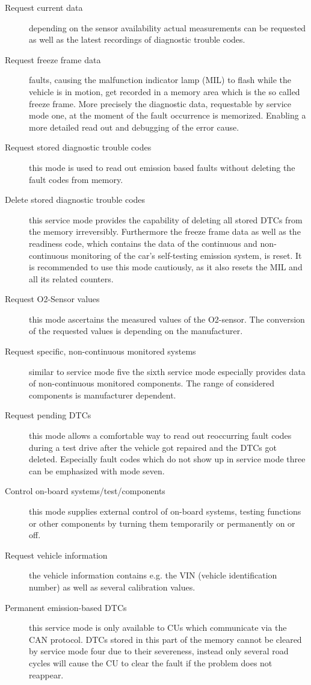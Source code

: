 \begin{description}
 \item[Request current data] depending on the sensor availability actual measurements can be requested as well as the latest recordings of diagnostic trouble codes.
 \item[Request freeze frame data] faults, causing the malfunction indicator lamp (MIL) to flash while the vehicle is in motion, get recorded in a memory area which is the so called freeze frame. More precisely the diagnostic data, requestable by service mode one, at the moment of the fault occurrence is memorized. Enabling a more detailed read out and debugging of the error cause.
 \item[Request stored diagnostic trouble codes] this mode is used to read out emission based faults without deleting the fault codes from memory.
 \item[Delete stored diagnostic trouble codes] this service mode provides the capability of deleting all stored DTCs from the memory irreversibly. Furthermore the freeze frame data as well as the readiness code, which contains the data of the continuous and non-continuous monitoring of the car’s self-testing emission system, is reset. It is recommended to use this mode cautiously, as it also resets the MIL and all its related counters.
 \item[Request O2-Sensor values] this mode ascertains the measured values of the O2-sensor. The conversion of the requested values is depending on the manufacturer.
 \item[Request specific, non-continuous monitored systems] similar to service mode five the sixth service mode especially provides data of non-continuous monitored components. The range of considered components is  manufacturer dependent.
 \item[Request pending DTCs] this mode allows a comfortable way to read out reoccurring fault codes during a test drive after the vehicle got repaired and the DTCs got deleted. Especially fault codes which do not show up in service mode three can be emphasized with mode seven.
 \item[Control on-board systems/test/components]  this mode supplies external control of on-board systems, testing functions or other components by turning them temporarily or permanently  on or off.
 \item[Request vehicle information] the vehicle information contains e.g. the VIN (vehicle identification number) as well as several calibration values.
 \item[Permanent emission-based DTCs] this service mode is only available to CUs which communicate via the CAN protocol. DTCs stored in this part of the memory cannot be cleared by service mode four due to their severeness, instead only several road cycles will cause the CU to clear the fault if the problem does not reappear.
\end{description}

